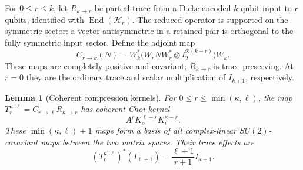 \documentclass[reqno]{amsart}
\newtheorem{lemma}[theorem]{Lemma}
\theoremstyle{definition}
\theoremstyle{remark}
\begin{document}
For $0\leq r\leq k$, let $R_{k\to r}$ be partial trace from a
Dicke-encoded $k$-qubit input to $r$ qubits, identified with
$\operatorname{End}(\mathcal H_r)$.  The reduced operator is supported
on the symmetric sector: a vector antisymmetric in a retained pair is
orthogonal to the fully symmetric input sector.  Define the adjoint map
\begin{equation}\label{spin:raw-cloner}
 C_{r\to k}(N)=
 W_k^*\bigl(W_rNW_r^*\otimes I_2^{\otimes(k-r)}\bigr)W_k.
\end{equation}
These maps are completely positive and covariant; $R_{k\to r}$ is
trace preserving.  At $r=0$ they are the ordinary trace and scalar
multiplication of $I_{k+1}$, respectively.

\begin{lemma}[Coherent compression kernels]\label{spin:compression}
For $0\leq r\leq\min(\kappa,\ell)$, the map
$T_r^{\kappa,\ell}=C_{r\to\ell}R_{\kappa\to r}$ has coherent Choi
kernel
\begin{equation}\label{spin:basis-kernel}
 A^rK_o^{\ell-r}K_i^{\kappa-r}.
\end{equation}
These $\min(\kappa,\ell)+1$ maps form a basis of all complex-linear
$SU(2)$-covariant maps between the two matrix spaces.  Their trace
effects are
\begin{equation}\label{spin:basis-effect}
 (T_r^{\kappa,\ell})^*(I_{\ell+1})
            =\frac{\ell+1}{r+1}I_{\kappa+1}.
\end{equation}
\end{lemma}
\end{document}
